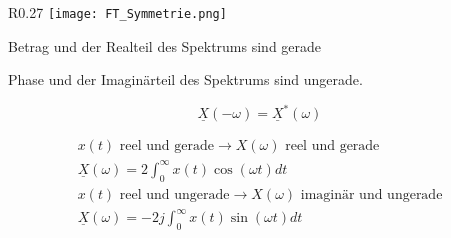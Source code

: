 \begin{mdframed}[style=exercise,frametitle=Symmetrie,nobreak=true]
            \begin{wrapfigure}[10]{R}{0.27\textwidth}
                \vspace{-1.4em}
                \texttt{[image: FT\_Symmetrie.png]}
            \end{wrapfigure}

           \begin{minipage}{5cm}
                Betrag und der Realteil des Spektrums sind gerade\\
            \end{minipage}

            \begin{minipage}{5cm}
                Phase und der Imaginärteil des Spektrums sind ungerade.
            \end{minipage}

            \[
                \underline{X}(-\omega) = \underline{X}^*(\omega)
            \]

            \begin{gather*}
                x(t)\text{ reel und gerade}\rightarrow X(\omega)\text{ reel und gerade}\\
                \underline{X}(\omega) = 2\int_0^\infty x(t)\cos(\omega t)dt\\
                x(t)\text{ reel und ungerade}\rightarrow X(\omega)\text{ imaginär und ungerade}\\
                \underline{X}(\omega) = -2j\int_0^\infty x(t)\sin(\omega t)dt
            \end{gather*}
\end{mdframed}
